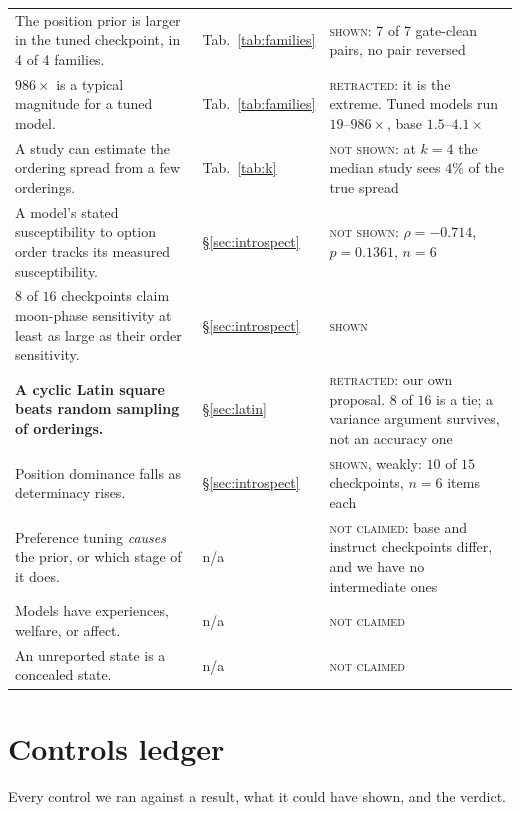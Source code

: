 \documentclass{article}
\begin{document}
{\begin{longtable}{@{}L{0.50\textwidth} L{0.20\textwidth} L{0.24\textwidth}@{}}
The position prior is larger in the tuned checkpoint, in 4 of 4 families. & Tab.~\ref{tab:families} & \textsc{shown}: 7 of 7 gate-clean pairs, no pair reversed \\
$986\times$ is a typical magnitude for a tuned model. & Tab.~\ref{tab:families} & \textsc{retracted}: it is the extreme. Tuned models run $19$--$986\times$, base $1.5$--$4.1\times$ \\
A study can estimate the ordering spread from a few orderings. & Tab.~\ref{tab:k} & \textsc{not shown}: at $k=4$ the median study sees $4\%$ of the true spread \\
A model's stated susceptibility to option order tracks its measured susceptibility. & \S\ref{sec:introspect} & \textsc{not shown}: $\rho = -0.714$, $p = 0.1361$, $n = 6$ \\
$8$ of $16$ checkpoints claim moon-phase sensitivity at least as large as their order sensitivity. & \S\ref{sec:introspect} & \textsc{shown} \\
\textbf{A cyclic Latin square beats random sampling of orderings.} & \S\ref{sec:latin} & \textsc{retracted}: our own proposal. $8$ of $16$ is a tie; a variance argument survives, not an accuracy one \\
Position dominance falls as determinacy rises. & \S\ref{sec:introspect} & \textsc{shown}, weakly: $10$ of $15$ checkpoints, $n=6$ items each \\
Preference tuning \emph{causes} the prior, or which stage of it does. & n/a & \textsc{not claimed}: base and instruct checkpoints differ, and we have no intermediate ones \\
Models have experiences, welfare, or affect. & n/a & \textsc{not claimed} \\
An unreported state is a concealed state. & n/a & \textsc{not claimed} \\
\end{longtable}
}

\section{Controls ledger}
\label{app:controls}

Every control we ran against a result, what it could have shown, and the verdict.
\end{document}
